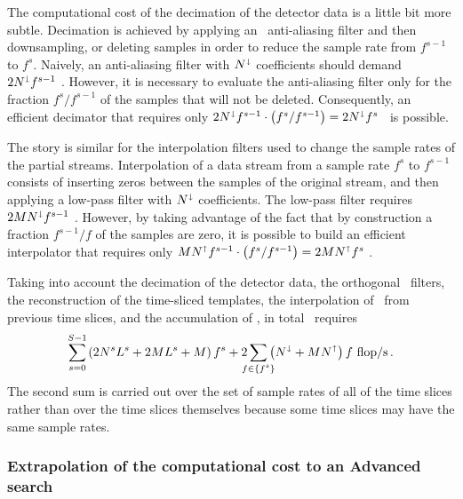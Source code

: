The computational cost of the decimation of the detector data is a little bit more subtle.  Decimation is achieved by applying an \fir\ anti-aliasing filter and then downsampling, or deleting samples in order to reduce the sample rate from $f^{s-1}$ to $f^s$.  Naively, an anti-aliasing filter with $N^\shortdownarrow$ coefficients should demand $2 N^\shortdownarrow f^{s-1}$ \flops.  However, it is necessary to evaluate the anti-aliasing filter only for the fraction $f^s / f^{s-1}$ of the samples that will not be deleted.  Consequently, an efficient decimator that requires only $2 N^\shortdownarrow f^{s-1} \cdot \left( f^s / f^{s-1} \right) = 2 N^\shortdownarrow f^s$ \flops\ is possible.

The story is similar for the interpolation filters used to change the sample rates of the partial \SNR{} streams.  Interpolation of a data stream from a sample rate $f^s$ to $f^{s-1}$ consists of inserting zeros between the samples of the original stream, and then applying a low-pass filter with $N^\shortdownarrow$ coefficients.  The low-pass filter requires $2 M N^\shortdownarrow f^{s-1}$ \flops.  However, by taking advantage of the fact that by construction a fraction $f^{s-1}/f$ of the samples are zero, it is possible to build an efficient interpolator that requires only $M N^\shortuparrow f^{s-1} \cdot \left( f^s / f^{s-1} \right) = 2 M N^\shortuparrow f^s$ \flops.

Taking into account the decimation of the detector data, the orthogonal \fir\ filters, the reconstruction of the time-sliced templates, the interpolation of \SNR\ from previous time slices, and the accumulation of \SNR, in total \lloid\ requires
$$
\sum_{\mathclap{s=0}}^{\mathclap{S-1}} \left( 2 \slicessamps \numsvdtmps + 2 \numtmps \numsvdtmps + \numtmps \right) f^s + 2\sum_{\mathclap{f \in \{f^s\}}} \left( N^\shortdownarrow + \numtmps N^\shortuparrow \right) f \textrm{ \flops}\,.
$$
The second sum is carried out over the set of sample rates of all of the time slices rather than over the time slices themselves because some time slices may have the same sample rates.

\subsubsection{Extrapolation of the computational cost to an Advanced \LIGO{} search}

